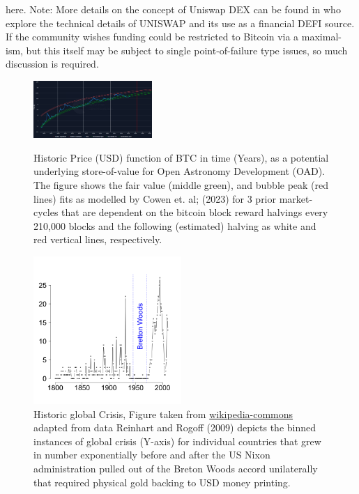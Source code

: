 \documentclass[final,5p,times,twocolumn,authoryear]{elsarticle}
\begin{document}
here. Note:  More details on the concept of Uniswap DEX can be found in \cite{uniswap2019_angeris} who explore the technical details of UNISWAP and its use as a financial DEFI source. If the community wishes funding could be restricted to Bitcoin via a maximal-ism, but this itself may be subject to single point-of-failure type issues, so much discussion is required.  

 \begin{figure}[ht!]
  \centering
  \caption{Historic Price (USD) function of BTC in time (Years), as a potential underlying store-of-value for Open Astronomy Development (OAD). The figure shows the fair value (middle green), and bubble peak (red lines) fits as modelled by Cowen et. al; (2023) for 3 prior market-cycles that are dependent on the bitcoin block reward halvings every 210,000 blocks and the following (estimated) halving as white and red vertical lines, respectively.}
  \includegraphics[width=0.4\textwidth]{figs/cowen3.png}
  \label{fig:cowen}
  \end{figure}

\begin{figure}[h!]
    \centering
  \caption{Historic global Crisis, Figure taken from \href{https://en.wikipedia.org/wiki/Global_recession}{wikipedia-commons} adapted from data Reinhart and Rogoff (2009) depicts the binned instances of global crisis (Y-axis) for individual countries that grew in number exponentially before and after the US Nixon administration pulled out of the Breton Woods accord unilaterally that required physical gold backing to USD money printing.}
  \label{fig:crisis}
  \includegraphics[width=0.5\textwidth]{figs/330px-BankingCrises.svg.png}
\end{figure}
\end{document}
